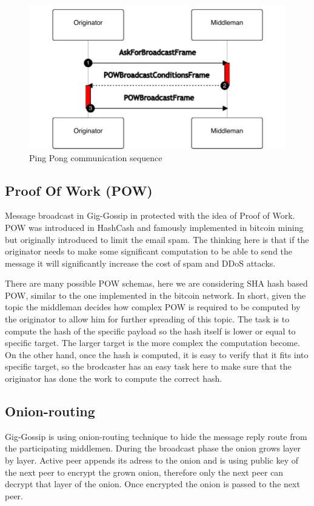 \documentclass{article}
\begin{document}
\begin{figure}
	\centering
	\includegraphics[scale=0.6]{PingPong.pdf}
	\caption{Ping Pong communication sequence}
	\label{fig:fr:pingpong}
\end{figure}

\subsection{Proof Of Work (POW)}
Message broadcast in Gig-Gossip in protected with the idea of Proof of Work. POW was introduced in HashCash \cite{Hashcash} and famously implemented in bitcoin mining but originally introduced to limit the email spam. The thinking here is that if the originator needs to make some significant computation to be able to send the message it will significantly increase the cost of spam and DDoS attacks. 

There are many possible POW schemas, here we are considering SHA hash based POW, similar to the one implemented in the bitcoin network. In short, given the topic the middleman decides how complex POW is required to be computed by the originator to allow him for further spreading of this topic. The task is to compute the hash of the specific payload so the hash itself is lower or equal to specific target. The larger target is the more complex the computation become. On the other hand, once the hash is computed, it is easy to verify that it fits into specific target, so the brodcaster has an easy task here to make sure that the originator has done the work to compute the correct hash.

\subsection{Onion-routing}

Gig-Gossip is using onion-routing technique to hide the message reply route from the participating middlemen. During the broadcast phase the onion grows layer by layer. Active peer appends its adress to the onion and is using public key of the next peer to encrypt the grown onion, therefore only the next peer can decrypt that layer of the onion. Once encrypted the onion is passed to the next peer.
\end{document}
